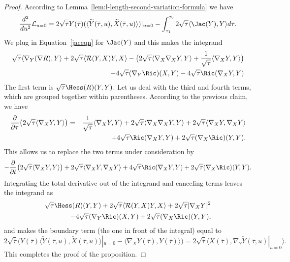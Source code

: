 \begin{proof}
\sketch
{}
According to Lemma~\ref{lem:l-length-second-variation-formula} we have
$$\frac{d^2}{du^2}{\mathcal L}_{u=0}=2\sqrt{\bar
\tau}Y(\bar\tau)(\langle \widetilde Y(\bar\tau,u),\widetilde
X(\bar\tau,u)\rangle)|_{u=0}-\int_{\tau_1}^{\tau_2}2\sqrt{\tau}\langle
\Jac(Y),Y\rangle d\tau.$$ We plug in
Equation~\ref{jaceqn} for $\Jac(Y)$ and this makes the
integrand
\begin{eqnarray*}\sqrt{\tau}\langle\nabla_Y(\nabla
R),Y\rangle+2\sqrt{\tau}\langle{\mathcal R}(Y,X)Y,X\rangle
-\bigl(2\sqrt{\tau}\langle\nabla_X\nabla_XY,Y\rangle+\frac{1}{\sqrt{\tau}}\langle\nabla_XY,Y\rangle\bigr)\\
-4\sqrt{\tau}(\nabla_Y\Ric)(X,Y)-4\sqrt{\tau}\Ric(\nabla_XY,Y)
\end{eqnarray*}
The first term is $\sqrt{\tau}\Hess(R)(Y,Y)$. Let us deal with
the third and fourth terms, which are grouped together within
parentheses. According to the previous claim, we have
\begin{eqnarray*}
\frac{\partial}{\partial \tau}\bigl(2\sqrt{\tau}\langle
\nabla_XY,Y\rangle\bigr) & = &
\frac{1}{\sqrt{\tau}}\langle\nabla_XY,Y\rangle+2\sqrt{\tau}\langle\nabla_X\nabla_XY,Y\rangle
 +2\sqrt{\tau}\langle\nabla_XY,\nabla_XY\rangle \\ & & +4\sqrt{\tau}\Ric(\nabla_XY,Y)
 +2\sqrt{\tau} (\nabla_X\Ric)(Y,Y).
\end{eqnarray*}
This allows us to replace the two terms under consideration by
$$-\frac{\partial}{\partial t}\bigl(2\sqrt{\tau}\langle
\nabla_XY,Y\rangle\bigr)+2\sqrt{\tau}\langle\nabla_XY,\nabla_XY\rangle+4\sqrt{\tau}\Ric(\nabla_XY,Y) +2\sqrt{\tau} (\nabla_X\Ric)(Y,Y).$$
Integrating the total derivative out of the integrand  and canceling
terms leaves the integrand as
\begin{eqnarray*}\sqrt{\tau}\Hess(R)(Y,Y)+2\sqrt{\tau}\langle{\mathcal R}(Y,X)Y,X\rangle
+2\sqrt{\tau}|\nabla_XY|^2 \\
-4\sqrt{\tau}(\nabla_Y\Ric)(X,Y)+2\sqrt{\tau} (\nabla_X\Ric)(Y,Y),
\end{eqnarray*}
and makes the boundary term (the one in front of the integral) equal
to
$$2\sqrt{\bar\tau}\bigl(Y(\bar\tau)\langle
\widetilde Y(\bar\tau,u),\widetilde
X(\bar\tau,u)\rangle|_{u=0}-\langle
\nabla_XY(\bar\tau),Y(\bar\tau)\rangle\bigr)=2\sqrt{\bar\tau}\langle
X(\bar\tau),\nabla_Y\widetilde Y(\bar\tau,u)|_{u=0}\rangle.$$ This
completes the proof of the proposition.
\end{proof}








